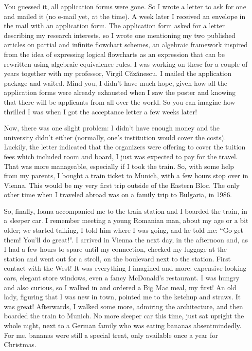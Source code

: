 \documentclass[12pt]{book}
\begin{document}
You guessed it, all application forms were gone. So I wrote a letter to
ask for one and mailed it (no e-mail yet, at the time). A week later I
received an envelope in the mail with an application form. The
application form asked for a letter describing my research interests, so
I wrote one mentioning my two published articles on partial and infinite
flowchart schemes, an algebraic framework inspired from the idea of
expressing logical flowcharts as an expression that can be rewritten
using algebraic equivalence rules. I was working on these for a couple
of years together with my professor, Virgil Căzănescu. I mailed the
application package and waited. Mind you, I didn't have much hope, given
how all the application forms were already exhausted when I saw the
poster and knowing that there will be applicants from all over the
world. So you can imagine how thrilled I was when I got the acceptance
letter a few weeks later!

Now, there was one slight problem: I didn't have enough money and the
university didn't either (normally, one's institution would cover the
costs). Luckily, the letter indicated that the organizers were offering
to cover the tuition fees which included room and board, I just was
expected to pay for the travel. That was more manageable, especially if
I took the train. So, with some help from my parents, I bought a train
ticket to Munich, with a few hours stop over in Vienna. This would be my
very first trip outside of the Eastern Bloc. The only other time when I
traveled abroad was on a family trip to Bulgaria, in 1986.

So, finally, Ioana accompanied me to the train station and I boarded the
train, in a sleeper car. I remember meeting a young Romanian man, about
my age or a bit older; we started talking, I told him where I was going,
and he told me: ``Go get them! You'll do great!''. I arrived in Vienna
the next day, in the afternoon and, as I had a few hours to spare until
my connection, checked my luggage at the station and went out for a
stroll, on the boulevard next to the station. First contact with the
West! It was everything I imagined and more: expensive looking cars,
elegant store windows, even a fancy McDonald's restaurant. I was hungry
and also curious, so I walked in and ordered a Big Mac meal, my first!
An old lady, figuring that I was new in town, pointed me to the ketchup
and straws. It was great! Afterwards, I walked some more, admiring the
architecture, and then boarded the train to Munich. No more sleeper car
this time, just sat upright the whole night, next to a German family who
was eating bananas absentmindedly. For me, bananas were still a special
treat, only available once a year for Christmas.
\end{document}
